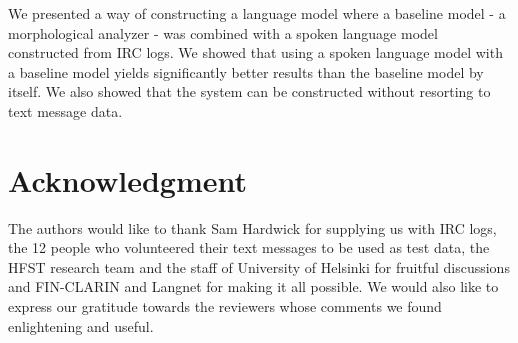 \documentclass[a4paper,conference]{IEEEtran}
\begin{document}
We presented a way of constructing a language model where a baseline
model - a morphological analyzer - was combined with a spoken language
model constructed from IRC logs. We showed that using a spoken
language model with a baseline model yields significantly better
results than the baseline model by itself. We also showed that the
system can be constructed without resorting to text message data.

\section*{Acknowledgment}

The authors would like to thank Sam Hardwick for supplying us with IRC logs, the 12 people who volunteered their text messages to be used as test data, the HFST research team and the staff of University of Helsinki for fruitful discussions and FIN-CLARIN and Langnet for making it all possible. We would also like to express our gratitude towards the reviewers whose comments we found enlightening and useful.




\end{document}

